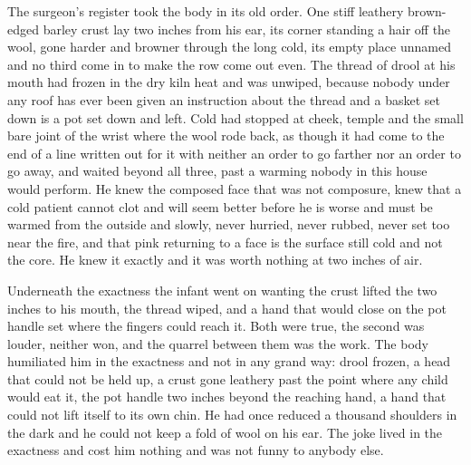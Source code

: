 The surgeon's register took the body in its old order. One stiff leathery brown-edged barley crust lay two inches from his ear, its corner standing a hair off the wool, gone harder and browner through the long cold, its empty place unnamed and no third come in to make the row come out even. The thread of drool at his mouth had frozen in the dry kiln heat and was unwiped, because nobody under any roof has ever been given an instruction about the thread and a basket set down is a pot set down and left. Cold had stopped at cheek, temple and the small bare joint of the wrist where the wool rode back, as though it had come to the end of a line written out for it with neither an order to go farther nor an order to go away, and  waited beyond all three, past a warming nobody in this house would perform. He knew the composed face that was not composure, knew that a cold patient cannot clot and will seem better before he is worse and must be warmed from the outside and slowly, never hurried, never rubbed, never set too near the fire, and that pink returning to a face is the surface still cold and not the core. He knew it exactly and it was worth nothing at two inches of air.

Underneath the exactness the infant went on wanting the crust lifted the two inches to his mouth, the thread wiped, and a hand that would close on the pot handle set where the fingers could reach it. Both were true, the second was louder, neither won, and the quarrel between them was the work. The body humiliated him in the exactness and not in any grand way: drool frozen, a head that could not be held up, a crust gone leathery past the point where any child would eat it, the pot handle two inches beyond the reaching hand, a hand that could not lift itself to its own chin. He had once reduced a thousand shoulders in the dark and he could not keep a fold of wool on his ear. The joke lived in the exactness and cost him nothing and was not funny to anybody else.

\scenebreak

